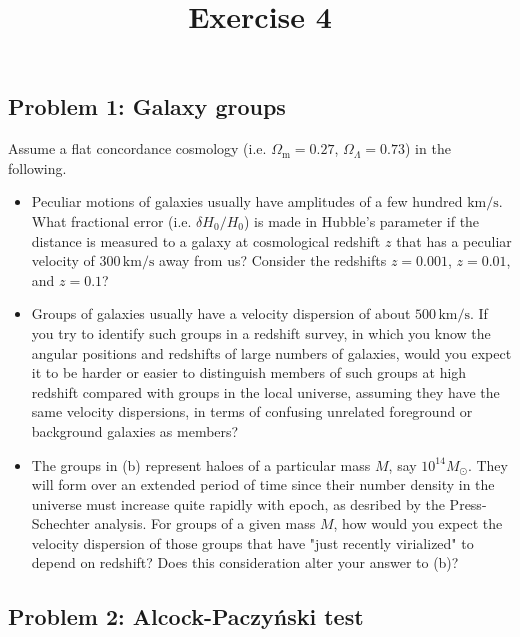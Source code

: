 \documentclass[a4paper]{article}
\begin{document}
\title{\textbf{Exercise 4}}
\author{}
\date{}

\maketitle

\subsection*{Problem 1: Galaxy groups}

Assume a flat concordance cosmology (i.e. $\Omega_\mathrm{m}=0.27$, $\Omega_\Lambda=0.73$) in the following.

\begin{itemize}
    \item[(a)] Peculiar motions of galaxies usually have amplitudes of a few hundred $\mathrm{km/s}$. What fractional error (i.e. $\delta H_0/H_0$) is made in Hubble's parameter if the distance is measured to a galaxy at cosmological redshift $z$ that has a peculiar velocity of $300\,\mathrm{km/s}$ away from us? Consider the redshifts $z=0.001$, $z=0.01$, and $z=0.1$?
    
    \item[(b)] Groups of galaxies usually have a velocity dispersion of about $500\,\mathrm{km/s}$. If you try to identify such groups in a redshift survey, in which you know the angular positions and redshifts of large numbers of galaxies, would you expect it to be harder or easier to distinguish members of such groups at high redshift compared with groups in the local universe, assuming they have the same velocity dispersions, in terms of confusing unrelated foreground or background galaxies as members?
    
    \item[(c)] The groups in (b) represent haloes of a particular mass $M$, say $10^{14} M_\odot$. They will form over an extended period of time since their number density in the universe must increase quite rapidly with epoch, as desribed by the Press-Schechter analysis. For groups of a given mass $M$, how would you expect the velocity dispersion of those groups that have "just recently virialized" to depend on redshift? Does this consideration alter your answer to (b)?
\end{itemize}

\subsection*{Problem 2: Alcock-Paczy\'{n}ski test}
\end{document}
